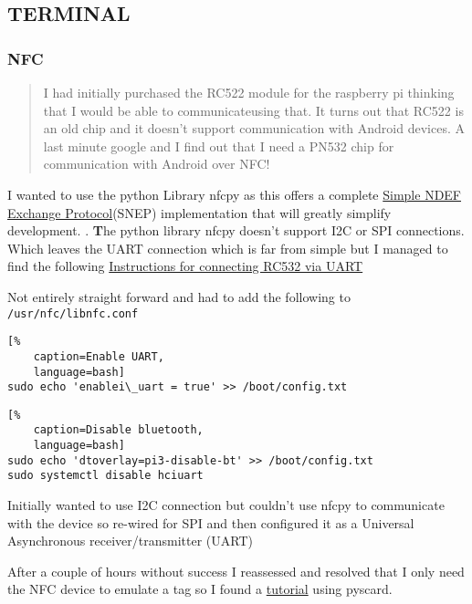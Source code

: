 \documentclass[a4paper]{article}
\begin{document}
\subsection{\textbf{TERMINAL}}
\subsubsection{NFC}

\begin{quote}
I had initially purchased the RC522 module for the raspberry pi thinking that I
would be able to communicateusing that.  It turns out that RC522 is an old
chip and it doesn't support communication with Android devices.  A last minute
google and I find out that I need a PN532 chip for communication with Android
over NFC!
\end{quote}

I wanted to use the python Library nfcpy as this offers a complete
\href{https://nfcpy.readthedocs.io/en/latest/topics/snep.html}{Simple NDEF Exchange
Protocol}(SNEP) implementation that will greatly simplify development.
.
{\textbf The python library nfcpy doesn't support I2C or SPI connections.} Which
leaves the UART connection which is far from simple but I managed to find the
following 
\href{https://learn.adafruit.com/adafruit-nfc-rfid-on-raspberry-pi/building-libnfc}
{Instructions for connecting RC532 via UART}

Not entirely straight forward and had to add the following to
\verb|/usr/nfc/libnfc.conf|

\begin{lstlisting}[%
	caption=Enable UART,
	language=bash]
sudo echo 'enablei\_uart = true' >> /boot/config.txt
\end{lstlisting}

\begin{lstlisting}[%
	caption=Disable bluetooth,
	language=bash]
sudo echo 'dtoverlay=pi3-disable-bt' >> /boot/config.txt
sudo systemctl disable hciuart
\end{lstlisting}

Initially wanted to use I2C connection but couldn't use nfcpy to communicate with
the device so re-wired for SPI and then configured it as a Universal Asynchronous
receiver/transmitter (UART)

After a couple of hours without success I reassessed and resolved that I only need
the NFC device to emulate a tag so I found a
\href{https://salmg.net/2017/12/11/acr122upn532-nfc-card-emulation/}{tutorial} using
pyscard.
\end{document}
